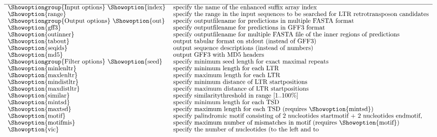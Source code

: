 \documentclass[12pt,titlepage]{article}
\newcommand{\LTRharvest}{\textit{LTRharvest}\xspace}
\begin{document}
\begin{table}[htbp]
\caption{Overview of the \LTRharvest options sorted by categories.}
\begin{footnotesize}
\[
\renewcommand{\arraystretch}{0.89}
\begin{tabular}{ll}\hline
\Showoptiongroup{Input options}
\Showoption{index}& specify the name of the enhanced suffix array index
\\
\Showoption{range}& specify the range in the input sequences to be searched for
LTR retrotransposon candidates
\\
\Showoptiongroup{Output options}
\Showoption{out}& specify outputfilename for predictions in multiple FASTA
format
\\
\Showoption{gff3}& specify outputfilename for predictions in GFF3 format
\\
\Showoption{outinner}& specify outputfilename for multiple FASTA file
of the inner regions of predictions
\\
\Showoption{tabout}& output tabular format on stdout (instead of GFF3)
\\
\Showoption{seqids}& output sequence descriptions (instead of numbers)
\\
\Showoption{md5}& output GFF3 with MD5 headers
\\
\Showoptiongroup{Filter options}
\Showoption{seed}& specify minimum seed length for exact maximal repeats
\\
\Showoption{minlenltr}& specify minimum length for each LTR
\\
\Showoption{maxlenltr}& specify maximum length for each LTR
\\
\Showoption{mindistltr}& specify minimum distance of LTR
startpositions
\\
\Showoption{maxdistltr}& specify maximum distance of LTR
startpositions
\\
\Showoption{similar}& specify similaritythreshold in range [1..100\%]
\\
\Showoption{mintsd}& specify minimum length for each TSD
\\
\Showoption{maxtsd}& specify maximum length for each TSD (requires
\Showoption{mintsd})
\\
\Showoption{motif}& specify palindromic motif consisting of 2 nucleotides
startmotif + 2 nucleotides endmotif,
\\
\Showoption{motifmis}& specify maximum number of mismatches in motif
(requires \Showoption{motif})
\\
\Showoption{vic}& specify the number of nucleotides (to the left and to

\end{tabular}\]
\end{footnotesize}
\end{table}
\end{document}
